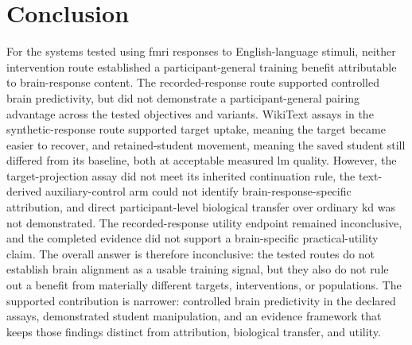 \section{Conclusion}
\label{sec:conclusion}
\enlargethispage{\baselineskip}

For the systems tested using \ac{fmri} responses to English-language stimuli, neither intervention route established a participant-general training benefit attributable to brain-response content.
The recorded-response route supported controlled brain predictivity, but did not demonstrate a participant-general pairing advantage across the tested objectives and variants.
WikiText assays in the synthetic-response route supported target uptake, meaning the target became easier to recover, and retained-student movement, meaning the saved student still differed from its baseline, both at acceptable measured \ac{lm} quality.
However, the target-projection assay did not meet its inherited continuation rule, the text-derived auxiliary-control arm could not identify brain-response-specific attribution, and direct participant-level biological transfer over ordinary \ac{kd} was not demonstrated.
The recorded-response utility endpoint remained inconclusive, and the completed evidence did not support a brain-specific practical-utility claim.
The overall answer is therefore inconclusive: the tested routes do not establish brain alignment as a usable training signal, but they also do not rule out a benefit from materially different targets, interventions, or populations.
The supported contribution is narrower: controlled brain predictivity in the declared assays, demonstrated student manipulation, and an evidence framework that keeps those findings distinct from attribution, biological transfer, and utility.

